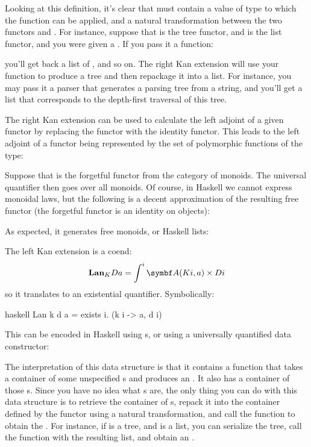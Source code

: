 Looking at this definition, it's clear that  must contain a
value of type  to which the function can be applied, and a
natural transformation between the two functors  and
. For instance, suppose that  is the tree functor,
and  is the list functor, and you were given a
. If you pass it a function:

you'll get back a list of , and so on. The right Kan
extension will use your function to produce a tree and then repackage it
into a list. For instance, you may pass it a parser that generates a
parsing tree from a string, and you'll get a list that corresponds to
the depth-first traversal of this tree.

The right Kan extension can be used to calculate the left adjoint of a
given functor by replacing the functor  with the identity
functor. This leads to the left adjoint of a functor  being
represented by the set of polymorphic functions of the type:

Suppose that  is the forgetful functor from the category of
monoids. The universal quantifier then goes over all monoids. Of course,
in Haskell we cannot express monoidal laws, but the following is a
decent approximation of the resulting free functor (the forgetful
functor  is an identity on objects):

As expected, it generates free monoids, or Haskell lists:

The left Kan extension is a coend:
\[\Lan_{K}D a = \int^i \cat{A}(K i, a)\times{}D i\]
so it translates to an existential quantifier. Symbolically:

\begin{snip}{haskell}
Lan k d a = exists i. (k i -> a, d i)
\end{snip}
This can be encoded in Haskell using s, or using a universally
quantified data constructor:

The interpretation of this data structure is that it contains a function
that takes a container of some unspecified s and produces an
. It also has a container of those s. Since you have
no idea what s are, the only thing you can do with this data
structure is to retrieve the container of s, repack it into
the container defined by the functor  using a natural
transformation, and call the function to obtain the . For
instance, if  is a tree, and  is a list, you can
serialize the tree, call the function with the resulting list, and
obtain an .

